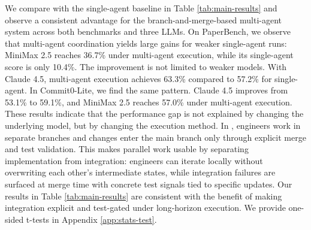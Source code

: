 
We compare \ourmethod with the single-agent baseline in Table \ref{tab:main-results} and observe a consistent advantage for the branch-and-merge-based multi-agent system across both benchmarks and three LLMs. On PaperBench, we observe that multi-agent coordination yields large gains for weaker single-agent runs: MiniMax 2.5 reaches 36.7\% under multi-agent execution, while its single-agent score is only 10.4\%. The improvement is not limited to weaker models. With Claude 4.5, multi-agent execution achieves 63.3\% compared to 57.2\% for single-agent. In Commit0-Lite, we find the same pattern. Claude 4.5 improves from 53.1\% to 59.1\%, and MiniMax 2.5 reaches 57.0\% under multi-agent execution. These results indicate that the performance gap is not explained by changing the underlying model, but by changing the execution method. In \ourmethod, engineers work in separate branches and changes enter the main branch only through explicit merge and test validation. This makes parallel work usable by separating implementation from integration: engineers can iterate locally without overwriting each other’s intermediate states, while integration failures are surfaced at merge time with concrete test signals tied to specific updates.  Our results in Table \ref{tab:main-results} are consistent with the benefit of making integration explicit and test-gated under long-horizon execution. We provide one-sided t-tests in Appendix \ref{app:stats-test}.



